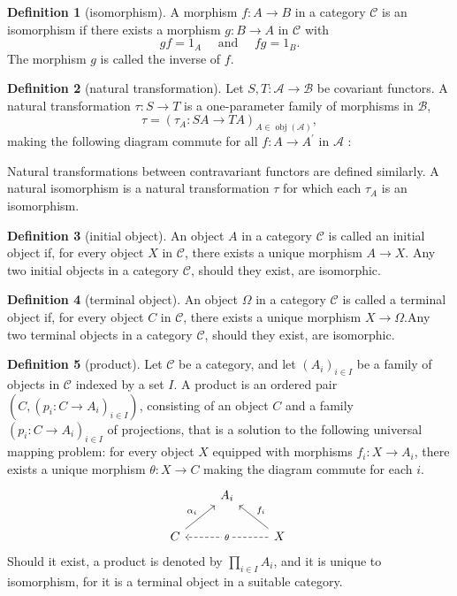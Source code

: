 \documentclass[a4paper,12pt]{article}
\theoremstyle{definition}
\newtheorem{defn}{Definition}[subsection]
\begin{document}
\begin{defn}[isomorphism]
    A morphism $f: A \rightarrow B$ in a category $\mathcal{C}$ is an isomorphism if there exists a morphism $g: B \rightarrow A$ in $\mathcal{C}$ with
    $$
        g f=1_A \quad \text { and } \quad f g=1_B .
    $$
    The morphism $g$ is called the inverse of $f$.
\end{defn}
\begin{defn}[natural transformation]
    Let $S, T: \mathcal{A} \rightarrow \mathcal{B}$ be covariant functors. A natural transformation $\tau: S \rightarrow T$ is a one-parameter family of morphisms in $\mathcal{B}$,
    $$
        \tau=\left(\tau_A: S A \rightarrow T A\right)_{A \in \operatorname{obj}(\mathcal{A})},
    $$
    making the following diagram commute for all $f: A \rightarrow A^{\prime}$ in $\mathcal{A}$ :

    Natural transformations between contravariant functors are defined similarly. A natural isomorphism is a natural transformation $\tau$ for which each $\tau_A$ is an isomorphism.
\end{defn}
\begin{defn}[initial object]
    An object $A$ in a category $\mathcal{C}$ is called an initial object if, for every object $X$ in $\mathcal{C}$, there exists a unique morphism $A \rightarrow X$. Any two initial objects in a category $\mathcal{C}$, should they
    exist, are isomorphic.
\end{defn}
\begin{defn}[terminal object]
    An object $\Omega$ in a category $\mathcal{C}$ is called a terminal object if, for every object $C$ in $\mathcal{C}$, there exists a unique morphism $X \rightarrow \Omega$.Any two terminal objects in a category $\mathcal{C}$, should they
    exist, are isomorphic.
\end{defn}
\begin{defn}[product]
    Let $\mathcal{C}$ be a category, and let $\left(A_i\right)_{i \in I}$ be a family of objects in $\mathcal{C}$ indexed by a set $I$. A product is an ordered pair $\left(C,\left(p_i: C \rightarrow A_i\right)_{i \in I}\right)$, consisting of an object $C$ and a family $\left(p_i: C \rightarrow A_i\right)_{i \in I}$ of projections, that
    is a solution to the following universal mapping problem: for every object $X$ equipped with morphisms $f_i: X \rightarrow A_i$, there exists a unique morphism $\theta: X \rightarrow C$ making the diagram commute for each $i$.
    \begin{equation*}
        \begin{tikzcd}
            & {A_i} \\
            C && X
            \arrow["{\alpha_i}", from=2-1, to=1-2]
            \arrow["\theta"{description}, dashed, from=2-3, to=2-1]
            \arrow["{f_i}"', from=2-3, to=1-2]
        \end{tikzcd}\
    \end{equation*}
    Should it exist, a product is denoted by $\prod_{i \in I} A_i$, and it is unique to isomorphism, for it is a terminal object in a suitable category.
\end{defn}
\end{document}
